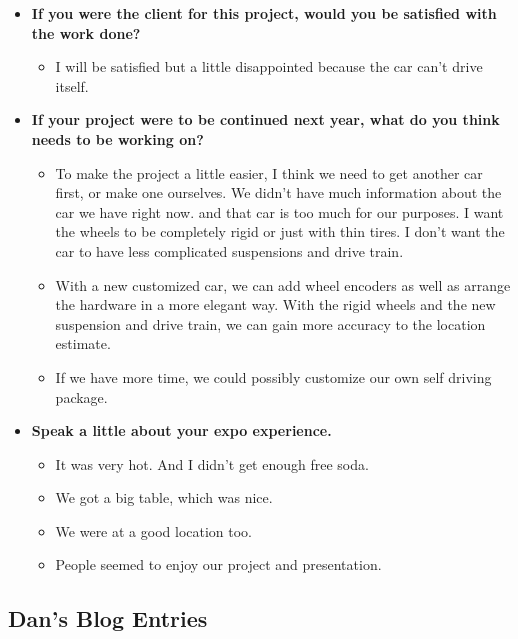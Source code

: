 \documentclass[compsoc,draftclsnofoot,onecolumn,10pt]{IEEEtran}
\begin{document}
\begin{itemize}
    \item{\textbf{If you were the client for this project, would you be satisfied with the work done?}}
    \begin{itemize}
      \item I will be satisfied but a little disappointed because the car can't drive itself.
    \end{itemize}

    \item{\textbf{If your project were to be continued next year, what do you think needs to be working on?}}
    \begin{itemize}
      \item To make the project a little easier, I think we need to get another car first,
      or make one ourselves. We didn't have much information about the car we have right
      now. and that car is too much for our purposes. I want the wheels to be completely
      rigid or just with thin tires. I don't want the car to have less complicated
      suspensions and drive train.
      \item With a new customized car, we can add wheel encoders as well as arrange the
      hardware in a more elegant way. With the rigid wheels and the new suspension and
      drive train, we can gain more accuracy to the location estimate.
      \item If we have more time, we could possibly customize our own self driving package.
    \end{itemize}

    \item{\textbf{Speak a little about your expo experience.}}
    \begin{itemize}
      \item It was very hot. And I didn't get enough free soda.
      \item We got a big table, which was nice.
      \item We were at a good location too.
      \item People seemed to enjoy our project and presentation.
    \end{itemize}

\end{itemize}

\subsection{Dan's Blog Entries}
\end{document}
